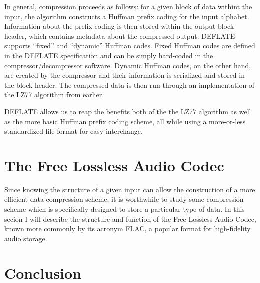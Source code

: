 \documentclass[12pt]{article}
\begin{document}
In general, compression proceeds as follows: for a given block of data
withint the input, the algorithm constructs a Huffman prefix coding
for the input alphabet. Information about the prefix coding is then
stored within the output block header, which contains metadata about the
compressed output. DEFLATE supports ``fixed'' and ``dynamic'' Huffman
codes. Fixed Huffman codes are defined in the DEFLATE specification
and can be simply hard-coded in the compressor/decompressor
software. Dynamic Huffman codes, on the other hand, are created by the
compressor and their information is serialized and stored in the block
header. The compressed data is then run through an implementation of
the LZ77 algorithm from earlier.

DEFLATE allows us to reap the benefits both of the the LZ77 algorithm
as well as the more basic Huffman prefix coding scheme, all while
using a more-or-less standardized file format for easy interchange.

\section{The Free Lossless Audio Codec}

Since knowing the structure of a given input can allow the
construction of a more efficient data compression scheme, it is
worthwhile to study some compression scheme which is specifically
designed to store a particular type of data. In this secion I will
describe the structure and function of the Free Lossless Audio Codec,
known more commonly by its acronym FLAC, a popular format for
high-fidelity audio storage.

\section{Conclusion}





\end{document}
